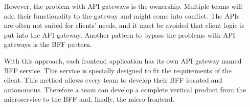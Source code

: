 \bigskip

\noindent However, the problem with \ac{API} gateways is the ownership. Multiple teams will add their functionality to the gateway and might come into conflict. The \acp{API} are often not suited for clients' needs, and it must be avoided that client logic is put into the \ac{API} gateway. Another pattern to bypass the problems with \ac{API} gateways is the \ac{BFF} pattern. \cite[265-266]{book:2018:richardson:background:bff:microservices-patterns}

\bigskip

\noindent With this approach, each frontend application has its own \ac{API} gateway named \ac{BFF} service. This service is specially designed to fit the requirements of the client. \cite[264-266]{book:2018:richardson:background:bff:microservices-patterns} \cite[71-72]{book:2021:newman:background:bff:micro-services} This method allows every team to develop their \ac{BFF} isolated and autonomous. Therefore a team can develop a complete vertical product from the microservice to the \ac{BFF} and, finally, the micro-frontend. \cite{book:2020:geers:background:micro-frontends:micro-frontends-in-action}
